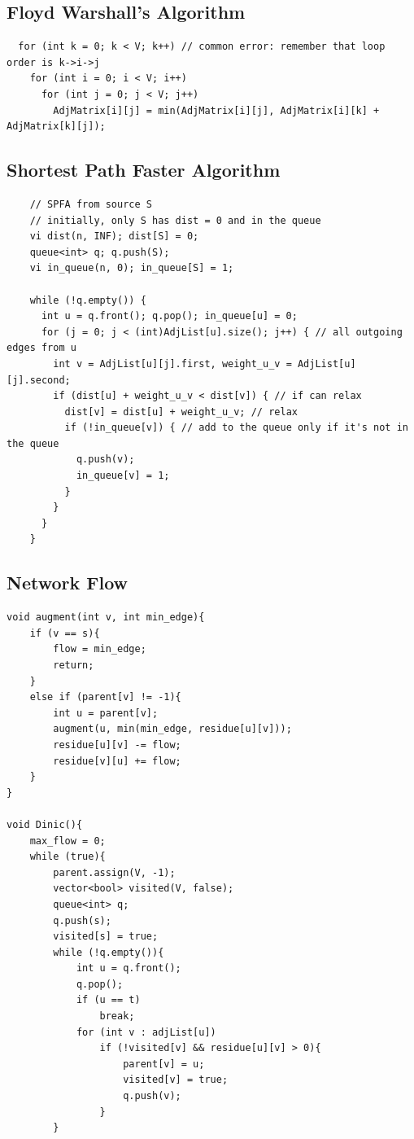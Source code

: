 \documentclass[10pt,landscape]{article}
\begin{document}
\begin{multicols}{2}
\subsection{Floyd Warshall's Algorithm}
\begin{lstlisting}
  for (int k = 0; k < V; k++) // common error: remember that loop order is k->i->j
    for (int i = 0; i < V; i++)
      for (int j = 0; j < V; j++)
        AdjMatrix[i][j] = min(AdjMatrix[i][j], AdjMatrix[i][k] + AdjMatrix[k][j]);
\end{lstlisting}
\newpage

\subsection{Shortest Path Faster Algorithm}
\begin{lstlisting}
    // SPFA from source S
    // initially, only S has dist = 0 and in the queue
    vi dist(n, INF); dist[S] = 0;
    queue<int> q; q.push(S);
    vi in_queue(n, 0); in_queue[S] = 1;

    while (!q.empty()) {
      int u = q.front(); q.pop(); in_queue[u] = 0;
      for (j = 0; j < (int)AdjList[u].size(); j++) { // all outgoing edges from u
        int v = AdjList[u][j].first, weight_u_v = AdjList[u][j].second;
        if (dist[u] + weight_u_v < dist[v]) { // if can relax
          dist[v] = dist[u] + weight_u_v; // relax
          if (!in_queue[v]) { // add to the queue only if it's not in the queue
            q.push(v);
            in_queue[v] = 1;
          }
        }
      }
    }
\end{lstlisting}

\subsection{Network Flow}
\begin{lstlisting}
void augment(int v, int min_edge){
    if (v == s){
        flow = min_edge;
        return;
    }
    else if (parent[v] != -1){
        int u = parent[v];
        augment(u, min(min_edge, residue[u][v]));
        residue[u][v] -= flow;
        residue[v][u] += flow;
    }
}

void Dinic(){
    max_flow = 0;
    while (true){
        parent.assign(V, -1);
        vector<bool> visited(V, false);
        queue<int> q;
        q.push(s);
        visited[s] = true;
        while (!q.empty()){
            int u = q.front();
            q.pop();
            if (u == t)
                break;
            for (int v : adjList[u])
                if (!visited[v] && residue[u][v] > 0){
                    parent[v] = u;
                    visited[v] = true;
                    q.push(v);
                }
        }


\end{lstlisting}
\end{multicols}
\end{document}
